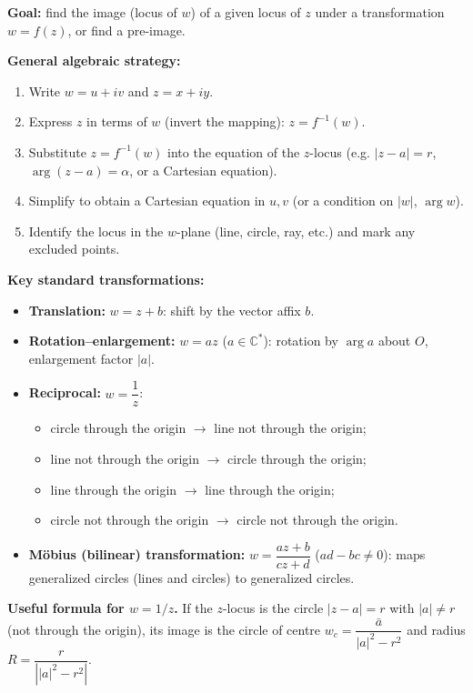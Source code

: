 \documentclass[11pt]{article}
\begin{document}
\begin{methode}
\textbf{Goal:} find the image (locus of $w$) of a given locus of $z$ under a transformation $w = f(z)$, or find a pre-image.

\textbf{General algebraic strategy:}
\begin{enumerate}
    \item Write $w = u+iv$ and $z = x+iy$.
    \item Express $z$ in terms of $w$ (invert the mapping): $z = f^{-1}(w)$.
    \item Substitute $z = f^{-1}(w)$ into the equation of the $z$-locus (e.g. $|z-a|=r$, $\arg(z-a)=\alpha$, or a Cartesian equation).
    \item Simplify to obtain a Cartesian equation in $u,v$ (or a condition on $|w|$, $\arg w$).
    \item Identify the locus in the $w$-plane (line, circle, ray, etc.) and mark any excluded points.
\end{enumerate}

\textbf{Key standard transformations:}
\begin{itemize}
    \item \textbf{Translation:} $w = z + b$: shift by the vector affix $b$.
    \item \textbf{Rotation--enlargement:} $w = az$ ($a \in \mathbb{C}^*$): rotation by $\arg a$ about $O$, enlargement factor $|a|$.
    \item \textbf{Reciprocal:} $w = \dfrac{1}{z}$:
        \begin{itemize}
            \item circle through the origin $\to$ line not through the origin;
            \item line not through the origin $\to$ circle through the origin;
            \item line through the origin $\to$ line through the origin;
            \item circle not through the origin $\to$ circle not through the origin.
        \end{itemize}
    \item \textbf{Möbius (bilinear) transformation:} $w = \dfrac{az+b}{cz+d}$ ($ad-bc \ne 0$): maps generalized circles (lines and circles) to generalized circles.
\end{itemize}

\textbf{Useful formula for $w=1/z$.} If the $z$-locus is the circle $|z-a|=r$ with $|a|\ne r$ (not through the origin), its image is the circle of centre $w_c = \dfrac{\bar{a}}{|a|^2 - r^2}$ and radius $R = \dfrac{r}{\left||a|^2 - r^2\right|}$.
\end{methode}
\end{document}
